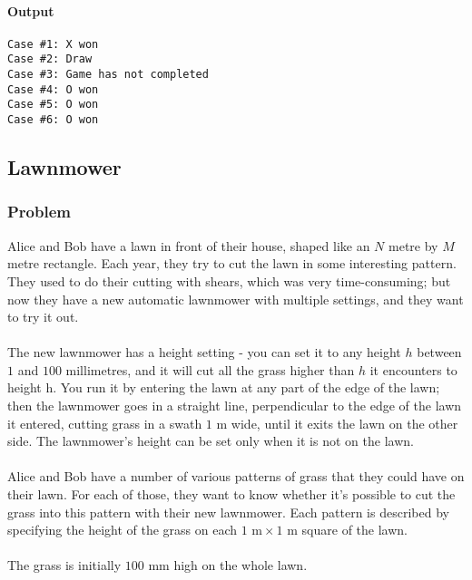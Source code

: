 \documentclass[titlepage]{article}
\begin{document}
\paragraph{Output}
\begin{verbatim}
Case #1: X won
Case #2: Draw
Case #3: Game has not completed
Case #4: O won
Case #5: O won
Case #6: O won
\end{verbatim}

\subsection{Lawnmower}

\subsubsection{Problem}
Alice and Bob have a lawn in front of their house, shaped like an $N$ metre by $M$ metre rectangle. Each year, they try to cut the lawn in some interesting pattern. They used to do their cutting with shears, which was very time-consuming; but now they have a new automatic lawnmower with multiple settings, and they want to try it out.
\paragraph{}
The new lawnmower has a height setting - you can set it to any height $h$ between $1$ and $100$ millimetres, and it will cut all the grass higher than $h$ it encounters to height h. You run it by entering the lawn at any part of the edge of the lawn; then the lawnmower goes in a straight line, perpendicular to the edge of the lawn it entered, cutting grass in a swath $1\mbox{ m}$ wide, until it exits the lawn on the other side. The lawnmower's height can be set only when it is not on the lawn.
\paragraph{}
Alice and Bob have a number of various patterns of grass that they could have on their lawn. For each of those, they want to know whether it's possible to cut the grass into this pattern with their new lawnmower. Each pattern is described by specifying the height of the grass on each $1\mbox{ m}\times1\mbox{ m}$ square of the lawn.
\paragraph{}
The grass is initially $100\mbox{ mm}$ high on the whole lawn.
\end{document}
